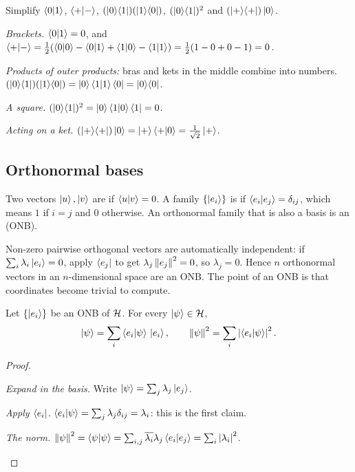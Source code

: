 \begin{example}\label{ex:diracsimplify}
  Simplify $\braket01$, $\braket+-$, $(\ket0\!\bra1)(\ket1\!\bra0)$, $(\ket0\!\bra1)^2$ and $(\ket+\!\bra+)\ket0$.
\end{example}
\begin{solution}
  \begin{steps}
    \item \emph{Brackets.} $\braket01=0$, and $\braket+-=\tfrac12(\braket0 0-\braket01+\braket10-\braket11)=\tfrac12(1-0+0-1)=0$.
    \item \emph{Products of outer products:} bras and kets in the middle combine into numbers. $(\ket0\!\bra1)(\ket1\!\bra0)=\ket0\braket11\bra0=\ket0\!\bra0$.
    \item \emph{A square.} $(\ket0\!\bra1)^2=\ket0\braket10\bra1=0$.
    \item \emph{Acting on a ket.} $(\ket+\!\bra+)\ket0=\ket+\braket+0=\tfrac1{\sqrt2}\ket+$.
  \end{steps}
\end{solution}

\subsection{Orthonormal bases}

\begin{definition}[Orthogonality]\label{def:ortho}
  Two vectors $\ket u,\ket v$ are  if $\braket uv=0$. A family $\{\ket{e_i}\}$ is  if $\braket{e_i}{e_j}=\delta_{ij}$, which means $1$ if $i=j$ and $0$ otherwise. An orthonormal family that is also a basis is an  (ONB).
\end{definition}

Non-zero pairwise orthogonal vectors are automatically independent: if $\sum_i\lambda_i\ket{e_i}=0$, apply $\bra{e_j}$ to get $\lambda_j\norm{e_j}^2=0$, so $\lambda_j=0$. Hence $n$ orthonormal vectors in an $n$-dimensional space are an ONB. The point of an ONB is that coordinates become trivial to compute.

\begin{theorem}\label{thm:parseval}
  Let $\{\ket{e_i}\}$ be an ONB of $\Hil$. For every $\ket\psi\in\Hil$,
  \[
    \ket\psi=\sum_i\braket{e_i}\psi\,\ket{e_i},\qquad \norm{\psi}^2=\sum_i\abs{\braket{e_i}\psi}^2 .
  \]
\end{theorem}
\begin{proof}
  \begin{steps}
    \item \emph{Expand in the basis.} Write $\ket\psi=\sum_j\lambda_j\ket{e_j}$.
    \item \emph{Apply $\bra{e_i}$.} $\braket{e_i}\psi=\sum_j\lambda_j\delta_{ij}=\lambda_i$: this is the first claim.
    \item \emph{The norm.} $\norm\psi^2=\braket\psi\psi=\sum_{i,j}\overline{\lambda_i}\lambda_j\braket{e_i}{e_j}=\sum_i\abs{\lambda_i}^2$. \qedhere
  \end{steps}
\end{proof}

